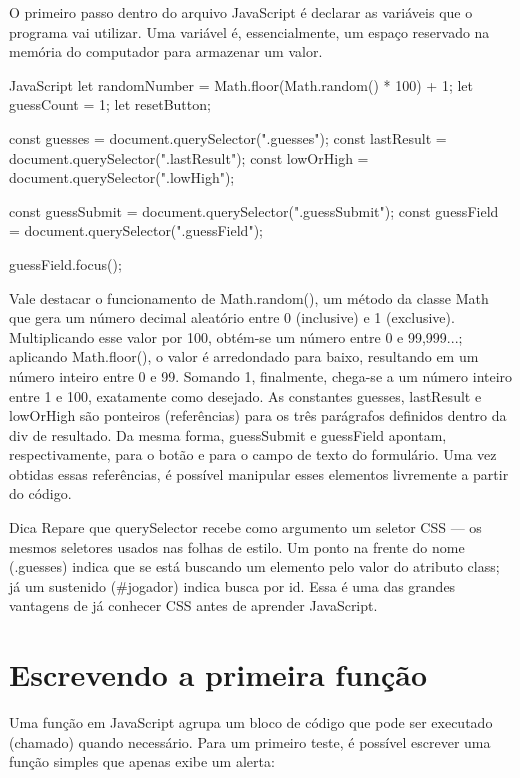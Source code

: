 O primeiro passo dentro do arquivo JavaScript é declarar as variáveis que o programa vai utilizar. Uma variável é, essencialmente, um espaço reservado na memória do computador para armazenar um valor.

\begin{codebox}{JavaScript}
 let randomNumber = Math.floor(Math.random() * 100) + 1;
 let guessCount = 1;
 let resetButton;

 const guesses = document.querySelector(".guesses");
 const lastResult = document.querySelector(".lastResult");
 const lowOrHigh = document.querySelector(".lowHigh");

 const guessSubmit = document.querySelector(".guessSubmit");
 const guessField = document.querySelector(".guessField");

 guessField.focus();
\end{codebox}

Vale destacar o funcionamento de Math.random(), um método da classe Math que gera um número decimal aleatório entre 0 (inclusive) e 1 (exclusive). Multiplicando esse valor por 100, obtém-se um número entre 0 e 99,999...; aplicando Math.floor(), o valor é arredondado para baixo, resultando em um número inteiro entre 0 e 99. Somando 1, finalmente, chega-se a um número inteiro entre 1 e 100, exatamente como desejado. As constantes guesses, lastResult e lowOrHigh são ponteiros (referências) para os três parágrafos definidos dentro da div de resultado. Da mesma forma, guessSubmit e guessField apontam, respectivamente, para o botão e para o campo de texto do formulário. Uma vez obtidas essas referências, é possível manipular esses elementos livremente a partir do código.

\begin{infobox}{Dica}
Repare que querySelector recebe como argumento um seletor CSS — os mesmos seletores usados nas folhas de estilo. Um ponto na frente do nome (.guesses) indica que se está buscando um elemento pelo valor do atributo class; já um sustenido (\#jogador) indica busca por id. Essa é uma das grandes vantagens de já conhecer CSS antes de aprender JavaScript.
\end{infobox}

\section{Escrevendo a primeira função}

Uma função em JavaScript agrupa um bloco de código que pode ser executado (chamado) quando necessário. Para um primeiro teste, é possível escrever uma função simples que apenas exibe um alerta:

